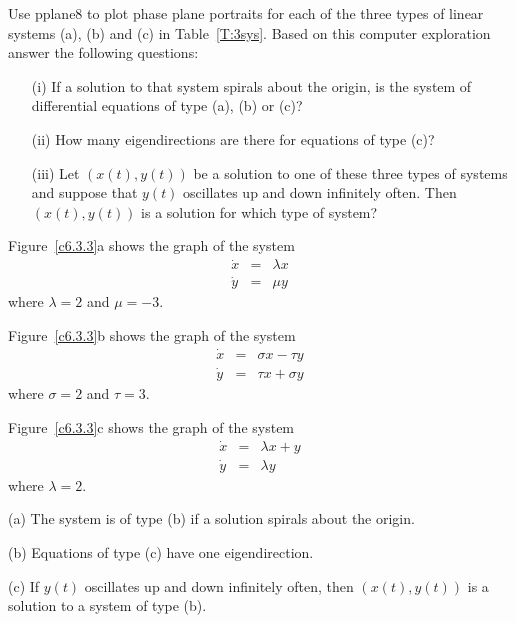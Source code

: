 \documentclass{ximera}
\begin{document}
\CEXER

\begin{exercise} \label{c6.3.3}
Use {\sf pplane8} to plot phase plane portraits for each of the
three types of linear systems (a), (b) and (c) in Table~\ref{T:3sys}.
Based on this computer exploration answer the following questions:
\begin{itemize}
\item[(i)]  If a solution to that system spirals about the origin,
is the system of differential equations of type (a), (b) or (c)?
\item[(ii)]  How many eigendirections are there for equations of type (c)?
\item[(iii)]  Let $(x(t),y(t))$ be a solution to one of these three types of
systems and suppose that $y(t)$ oscillates up and down infinitely often.
Then $(x(t),y(t))$ is a solution for which type of system?
\end{itemize}

\begin{solution}

Figure~\ref{c6.3.3}a shows the graph of the system
\[ \begin{array}{rrr}
\dot{x} & = & \lambda x \\ 
\dot{y} & = & \mu y \end{array} \]
where $\lambda = 2$ and $\mu = -3$.

\para Figure~\ref{c6.3.3}b shows the graph of the system
\[ \begin{array}{rrr}
\dot{x} & = & \sigma x - \tau y \\
\dot{y} & = & \tau x + \sigma y \end{array} \]
where $\sigma = 2$ and $\tau = 3$.

\para Figure~\ref{c6.3.3}c shows the graph of the system
\[ \begin{array}{rrr}
\dot{x} & = & \lambda x + y \\
\dot{y} & = & \lambda y \end{array} \]
where $\lambda = 2$.

(a) The system is of type (b) if a solution spirals about the origin.

(b) Equations of type (c) have one eigendirection.

(c) If $y(t)$ oscillates up and down infinitely often, then
$(x(t),y(t))$ is a solution to a system of type (b).


\begin{figure}[htb]
                       \centerline{%
                       }
\end{figure}



\end{solution}
\end{exercise}
\end{document}
